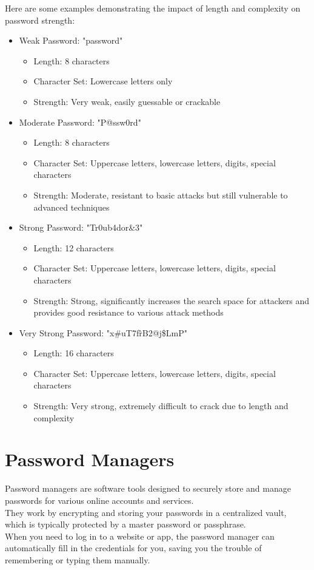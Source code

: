 \documentclass[10pt,oneside,english,a4paper]{article}
\begin{document}
Here are some examples demonstrating the impact of length and complexity on password strength:
\begin{itemize}
    \item Weak Password: "password"
	\begin{itemize}
       \item Length: 8 characters
       \item Character Set: Lowercase letters only
       \item Strength: Very weak, easily guessable or crackable
	\end{itemize}
    \item Moderate Password: "P@ssw0rd"
	\begin{itemize}
       \item Length: 8 characters
       \item Character Set: Uppercase letters, lowercase letters, digits, special characters
       \item Strength: Moderate, resistant to basic attacks but still vulnerable to advanced techniques
	\end{itemize}
    \item Strong Password: "Tr0ub4dor\&3"
	\begin{itemize}
       \item Length: 12 characters
       \item Character Set: Uppercase letters, lowercase letters, digits, special characters
       \item Strength: Strong, significantly increases the search space for attackers and provides good resistance to various attack methods
	\end{itemize}
    \item Very Strong Password: "x\#uT7f\^rB2@j\$LmP"
	\begin{itemize}
       \item Length: 16 characters
       \item Character Set: Uppercase letters, lowercase letters, digits, special characters
       \item Strength: Very strong, extremely difficult to crack due to length and complexity
	\end{itemize}
\end{itemize}

\pagebreak
\section{Password Managers}
Password managers are software tools designed to securely store and manage passwords for various online accounts and services.\\They work by encrypting and storing your passwords in a centralized vault, which is typically protected by a master password or passphrase. \\When you need to log in to a website or app, the password manager can automatically fill in the credentials for you, saving you the trouble of remembering or typing them manually.
\end{document}
